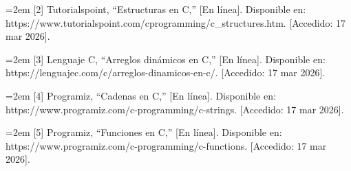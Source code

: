 \documentclass[letterpaper,12pt,oneside]{article}
\begin{document}
\noindent
\hangindent=2em
[2] Tutorialspoint, “Estructuras en C,” [En línea]. Disponible en: https://www.tutorialspoint.com/cprogramming/c_structures.htm. [Accedido: 17 mar 2026].

\medskip

\noindent
\hangindent=2em
[3] Lenguaje C, “Arreglos dinámicos en C,” [En línea]. Disponible en: https://lenguajec.com/c/arreglos-dinamicos-en-c/. [Accedido: 17 mar 2026].

\medskip

\noindent
\hangindent=2em
[4] Programiz, “Cadenas en C,” [En línea]. Disponible en: https://www.programiz.com/c-programming/c-strings. [Accedido: 17 mar 2026].

\medskip

\noindent
\hangindent=2em
[5] Programiz, “Funciones en C,” [En línea]. Disponible en: https://www.programiz.com/c-programming/c-functions. [Accedido: 17 mar 2026].
\end{document}
